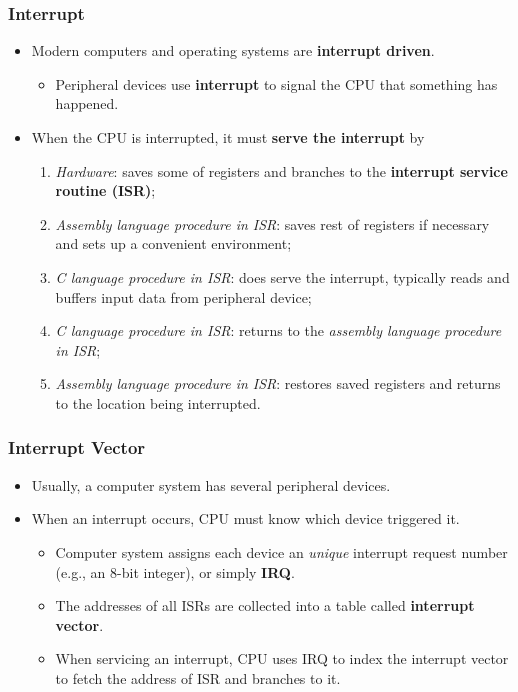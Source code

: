 \documentclass[CJKutf8,xcolor=pdftex,dvipsnames,table]{beamer}
\begin{document}
\begin{CJK*}{UTF8}{song}
  \begin{frame}
    \frametitle{Interrupt} \pause
    \begin{itemize}
    \item{Modern computers and operating systems are \textbf{interrupt driven}.} \pause
      \begin{itemize}
      \item{Peripheral devices use \textbf{interrupt} to signal the CPU that something has happened.} \pause
      \end{itemize}
    \item{When the CPU is interrupted, it must \textbf{serve the interrupt} by} \pause
      \begin{enumerate}
      \item{\emph{Hardware}: saves some of registers and branches to the \textbf{interrupt service routine (ISR)};} \pause
      \item{\emph{Assembly language procedure in ISR}: saves rest of registers if necessary and sets up a convenient environment;} \pause
      \item{\emph{C language procedure in ISR}: does serve the interrupt, typically reads and buffers input data from peripheral device;} \pause
      \item{\emph{C language procedure in ISR}: returns to the \emph{assembly language procedure in ISR};} \pause
      \item{\emph{Assembly language procedure in ISR}: restores saved registers and returns to the location being interrupted. }
      \end{enumerate}
    \end{itemize}
  \end{frame}

  \begin{frame}
    \frametitle{Interrupt Vector} \pause
    \begin{itemize}
    \item{Usually, a computer system has several peripheral devices.} \pause
    \item{When an interrupt occurs, CPU must know which device triggered it.} \pause
      \begin{itemize}
      \item{Computer system assigns each device an \emph{unique} interrupt request number (e.g., an 8-bit integer), or simply \textbf{IRQ}.} \pause
      \item{The addresses of all ISRs are collected into a table called \textbf{interrupt vector}.} \pause
      \item{When servicing an interrupt, CPU uses IRQ to index the interrupt vector to fetch the address of ISR and branches to it.}
      \end{itemize}
    \end{itemize}
  \end{frame}


\end{CJK*}
\end{document}
